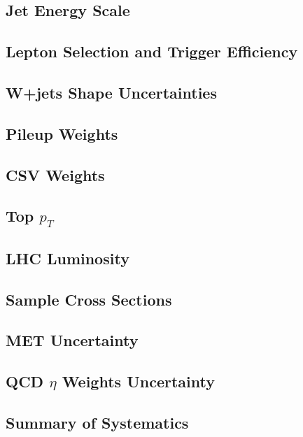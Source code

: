 \subsection{Jet Energy Scale}
\subsection{Lepton Selection and Trigger Efficiency}
\subsection{W+jets Shape Uncertainties}
\subsection{Pileup Weights}
\subsection{CSV Weights}
\subsection{Top $p_{T}$}
\subsection{LHC Luminosity}
\subsection{Sample Cross Sections}
\subsection{MET Uncertainty }
\subsection{QCD $\eta$ Weights Uncertainty}
\subsection{Summary of Systematics}


